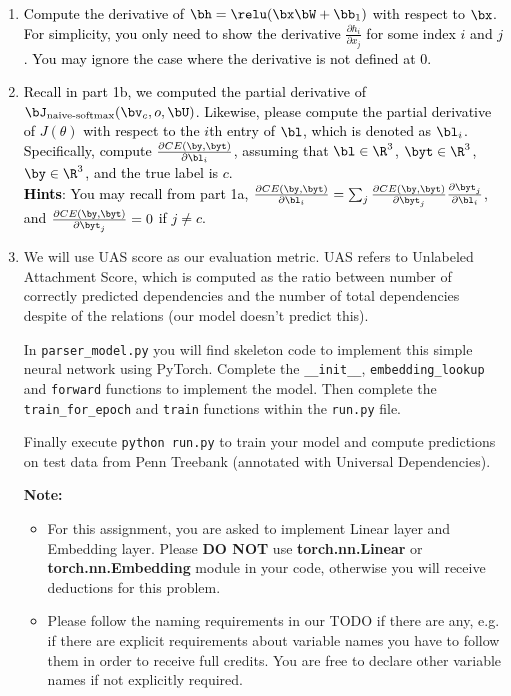\begin{parts}
\begin{enumerate}[label=\roman*.]
        \item \textcolor{black}{Compute the derivative of $\bh = \relu(\bx \bW + \bb_1)$ with respect to $\bx$. For simplicity, you only need to show the derivative $\frac{\partial h_i}{\partial x_j}$ for some index $i$ and $j$. You may ignore the case where the derivative is not defined at 0.}
        \item \textcolor{black}{Recall in part 1b, we computed the partial derivative of $\bJ_{\text{naive-softmax}}(\bv_c, o, \bU)$. Likewise, please compute the partial derivative of $J(\theta)$ with respect to the $i$th entry of $\bl$, which is denoted as $\bl_i$. Specifically, compute $\frac{\partial CE(\by, \byt)}{\partial \bl_i}$, assuming that $\bl \in \R^3$, $\byt \in \R^3$, $\by \in \R^3$, and the true label is $c$. \\
        \textbf{Hints}: You may recall from part 1a, $\frac{\partial CE(\by, \byt)}{\partial \bl_i} = \sum_j \frac{\partial CE(\by, \byt)}{\partial \byt_j}\frac{\partial \byt_j}{\partial \bl_i}$, and $\frac{\partial CE(\by, \byt)}{\partial \byt_j}=0$ if $j \neq c$. 
        }
        \item We will use UAS score as our evaluation metric. UAS refers to Unlabeled Attachment Score, which is computed as the ratio between number of correctly predicted dependencies and the number of total dependencies despite of the relations (our model doesn't predict this).\newline
    
   In \texttt{parser\_model.py} you will find skeleton code to implement this simple neural network using PyTorch. Complete the \texttt{\_\_init\_\_}, \texttt{embedding\_lookup} and \texttt{forward} functions to implement the model. Then complete the \texttt{train\_for\_epoch} and \texttt{train} functions within the \texttt{run.py} file.
   
    Finally execute \texttt{python run.py} to train your model and compute predictions
    on test data from Penn Treebank (annotated with Universal Dependencies). 
    
    \textbf{Note:}
    \begin{itemize}
        \item For this assignment, you are asked to implement Linear layer and Embedding layer. Please \textbf{DO NOT} use \textbf{torch.nn.Linear} or  \textbf{torch.nn.Embedding} module in your code, otherwise you will receive deductions for this problem. 
        \item Please follow the naming requirements in our TODO if there are any, e.g. if there are explicit requirements about variable names you have to follow them in order to receive full credits. You are free to declare other variable names if not explicitly required. 
    \end{itemize}
    

\end{enumerate}
\end{parts}
